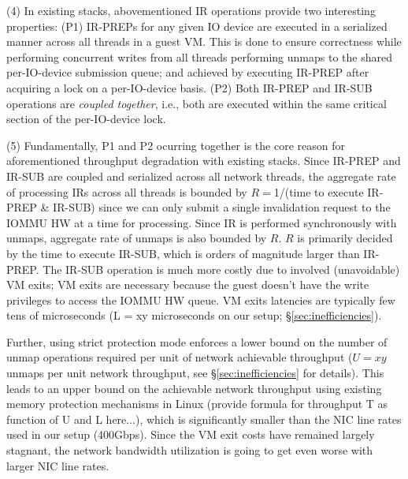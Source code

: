 (4) In existing stacks, abovementioned IR operations provide two interesting properties: (P1) IR-PREPs for any given IO device are executed in a {serialized manner across all threads in a guest VM}. This is done to ensure correctness while performing concurrent writes from all threads performing unmaps to the shared per-IO-device submission queue; and achieved by executing IR-PREP after acquiring a lock on a per-IO-device basis. (P2) Both IR-PREP and IR-SUB operations are {\it coupled together}, i.e., both are executed within the same critical section of the per-IO-device  lock. 

(5) Fundamentally, P1 and P2 ocurring together is the core reason for aforementioned throughput degradation with existing stacks. 
Since IR-PREP and IR-SUB are coupled and serialized across all network threads, the aggregate rate of processing IRs across all threads is bounded by $R = $1/(time to execute IR-PREP \& IR-SUB) since we can only submit a single invalidation request to the IOMMU HW at a time for processing. Since IR is performed synchronously with unmaps, aggregate rate of unmaps is also bounded by $R$. $R$ is primarily decided by the time to execute IR-SUB, which is orders of magnitude larger than IR-PREP. The IR-SUB operation is much more costly due to involved (unavoidable) VM exits; VM exits are necessary because the guest doesn't have the write privileges to access the IOMMU HW queue. VM exits latencies are typically few tens of microseconds (L = xy microseconds on our setup; \S\ref{sec:inefficiencies}).

Further, using strict protection mode enforces a lower bound on the number of unmap operations required per unit of network achievable throughput ($U = xy$ unmaps per unit network throughput, see \S\ref{sec:inefficiencies} for details).  This leads to an upper bound on the achievable network throughput using existing memory protection mechanisms in Linux (provide formula for throughput T as function of U and L here...), which is significantly smaller than the NIC line rates used in our setup (400Gbps). Since the VM exit costs have remained largely stagnant, the network bandwidth utilization is going to get even worse with larger NIC line rates. 

